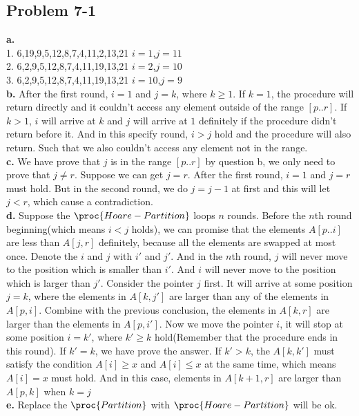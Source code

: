 \documentclass[12pt]{article}
\theoremstyle{definition}
\theoremstyle{remark}
\begin{document}
\subsection*{Problem 7-1}
\textbf{a.}\\
1. 6,19,9,5,12,8,7,4,11,2,13,21 $i=1$,$j=11$\\
2. 6,2,9,5,12,8,7,4,11,19,13,21 $i=2$,$j=10$\\
3. 6,2,9,5,12,8,7,4,11,19,13,21 $i=10$,$j=9$\\
\textbf{b.} After the first round, $i=1$ and $j=k$, where $k\ge 1$. If $k=1$, the procedure will return directly and it couldn't access any element outside of the range $[p..r]$. If $k>1$, $i$ will arrive at $k$ and $j$ will arrive at $1$ definitely if the procedure didn't return before it. And in this specify round, $i>j$ hold and the procedure will also return. Such that we also couldn't access any element not in the range.\\
\textbf{c.} We have prove that $j$ is in the range $[p..r]$ by question b, we only need to prove that $j\ne r$. Suppose we can get $j=r$. After the first round, $i=1$ and $j=r$ must hold. But in the second round, we do $j=j-1$ at first and this will let $j<r$, which cause a contradiction.\\
\textbf{d.} Suppose the $\proc{Hoare-Partition}$ loops $n$ rounds. Before the $n$th round beginning(which means $i<j$ holds), we can promise that the elements $A[p..i]$ are less than $A[j,r]$ definitely, because all the elements are swapped at most once. Denote the $i$ and $j$ with $i'$ and $j'$. And in the $n$th round, $j$ will never move to the position which is smaller than $i'$. And $i$ will never move to the position which is larger than $j'$. Consider the pointer $j$ first. It will arrive at some position $j=k$, where the elements in $A[k,j']$ are larger than any of the elements in $A[p,i]$. Combine with the previous conclusion, the elements in $A[k,r]$ are larger than the elements in $A[p,i']$. Now we move the pointer $i$, it will stop at some position $i=k'$, where $k'\ge k$ hold(Remember that the procedure ends in this round). If $k'=k$, we have prove the answer. If $k'>k$, the $A[k,k']$ must satisfy the condition $A[i]\ge x$ and $A[i]\le x$ at the same time, which means $A[i]=x$ must hold. And in this case, elements in $A[k+1,r]$ are larger than $A[p,k]$ when $k=j$\\
\textbf{e.} Replace the $\proc{Partition}$ with $\proc{Hoare-Partition}$ will be ok.
\end{document}
